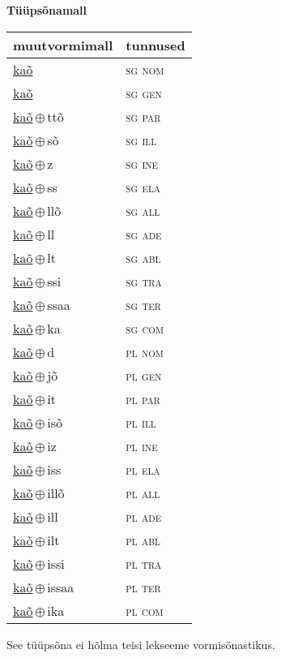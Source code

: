 

\vspace{3.5em}
\noindent \begin{minipage}{\textwidth}
\noindent \textbf{Tüüpsõnamall \,}\\

\begin{sideways}
\begin{tabular}{l l}
muutvormimall & tunnused \\
\hline
\underline{kaõ} & \textsc{ sg nom } \\
\underline{kaõ} & \textsc{ sg gen } \\
\underline{kaõ}\,$\oplus$\,ttõ & \textsc{ sg par } \\
\underline{kaõ}\,$\oplus$\,sõ & \textsc{ sg ill } \\
\underline{kaõ}\,$\oplus$\,z & \textsc{ sg ine } \\
\underline{kaõ}\,$\oplus$\,ss & \textsc{ sg ela } \\
\underline{kaõ}\,$\oplus$\,llõ & \textsc{ sg all } \\
\underline{kaõ}\,$\oplus$\,ll & \textsc{ sg ade } \\
\underline{kaõ}\,$\oplus$\,lt & \textsc{ sg abl } \\
\underline{kaõ}\,$\oplus$\,ssi & \textsc{ sg tra } \\
\underline{kaõ}\,$\oplus$\,ssaa & \textsc{ sg ter } \\
\underline{kaõ}\,$\oplus$\,ka & \textsc{ sg com } \\
\underline{kaõ}\,$\oplus$\,d & \textsc{ pl nom } \\
\underline{kaõ}\,$\oplus$\,jõ & \textsc{ pl gen } \\
\underline{kaõ}\,$\oplus$\,it & \textsc{ pl par } \\
\underline{kaõ}\,$\oplus$\,isõ & \textsc{ pl ill } \\
\underline{kaõ}\,$\oplus$\,iz & \textsc{ pl ine } \\
\underline{kaõ}\,$\oplus$\,iss & \textsc{ pl ela } \\
\underline{kaõ}\,$\oplus$\,illõ & \textsc{ pl all } \\
\underline{kaõ}\,$\oplus$\,ill & \textsc{ pl ade } \\
\underline{kaõ}\,$\oplus$\,ilt & \textsc{ pl abl } \\
\underline{kaõ}\,$\oplus$\,issi & \textsc{ pl tra } \\
\underline{kaõ}\,$\oplus$\,issaa & \textsc{ pl ter } \\
\underline{kaõ}\,$\oplus$\,ika & \textsc{ pl com } \\
\end{tabular}
\end{sideways}
\label{tab:tüüpsõnamall-kaõ}

\end{minipage}

 
\vspace{1em}
\noindent See tüüpsõna ei hõlma teisi lekseeme vormi\-sõnastikus.
